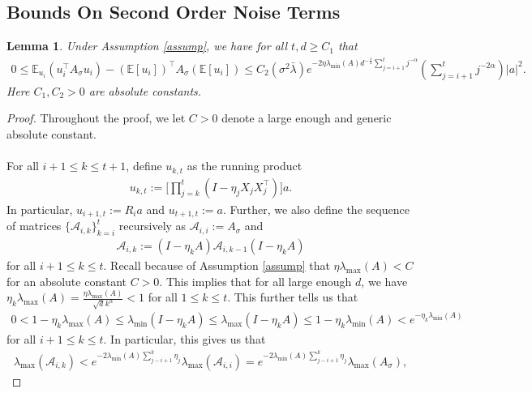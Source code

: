 \documentclass[11pt, reqno,english]{amsart}
\newtheorem{lemma}{Lemma}[section]
\begin{document}
\subsection{Bounds On Second Order Noise Terms}
\begin{lemma}\label{variance-auxilliary-helper}
Under Assumption \ref{assump}, we have for all $t, d \geq C_1$ that
\begin{align*}
0 \leq \mathbb{E}_{u_i}(u_i^\top A_{\sigma} u_i) 
- (\mathbb{E}[u_i])^\top A_{\sigma} (\mathbb{E}[u_i]) \leq C_2(\sigma^2 \bar{\lambda})e^{-2\eta \lambda_{\min}(A)d^{-\frac{1}{2}}\sum_{j = i+1}^tj^{-\alpha}}(\sum_{j = i+1}^tj^{-2\alpha})|a|^2.
\end{align*}
Here $C_1, C_2 > 0$ are absolute constants.
\end{lemma}
\begin{proof}
Throughout the proof, we let $C > 0$ denote a large enough and generic absolute constant.
\\\\
For all $i+1 \leq k \leq t+1$, define $u_{k,t}$ as the running  product
\begin{align*}
u_{k,t} := \bigg[\prod_{j = k}^{t}(I - \eta_{j}X_{j}X^\top_{j})\bigg]a.
\end{align*}
In particular, $u_{i+1,t} := R_ia$ and $u_{t+1,t} := a$. Further, we also define the sequence of matrices $\{\mathcal A_{i,k}\}_{k = i}^{t}$ recursively as $\mathcal A_{i,i} := A_{\sigma}$ and 
\begin{align*}
\mathcal A_{i,k} := (I - \eta_{k}A) \mathcal A_{i,k-1} (I - \eta_{k}A)
\end{align*}
for all $i+1 \leq k \leq t$. Recall because of Assumption \ref{assump} that $\eta \lambda_{\max}(A) < C$ for an absolute constant $C > 0$. This implies that for all large enough $d$, we have $\eta_k \lambda_{\max}(A) = \frac{\eta \lambda_{\max}(A)}{\sqrt{d}k^{\alpha}} < 1$ for all $1 \leq k \leq t$. This further tells us that 
\begin{align*}
0 < 1 - \eta_{k}\lambda_{\max}(A) \leq \lambda_{\min}(I - \eta_{k}A) \leq \lambda_{\max}(I - \eta_{k}A) \leq 1 - \eta_{k}\lambda_{\min}(A) < e^{-\eta_{k}\lambda_{\min}(A)}
\end{align*}
for all $i+1 \leq k \leq t$. In particular, this gives us that
\begin{align*}
\lambda_{\max}(\mathcal A_{i,k}) < e^{-2\lambda_{\min}(A) \sum_{j - i+1}^k \eta_j} \lambda_{\max}(\mathcal A_{i,i}) = e^{-2\lambda_{\min}(A) \sum_{j - i+1}^k \eta_j}\lambda_{\max}( A_{\sigma}),
\end{align*}

\end{proof}
\end{document}
